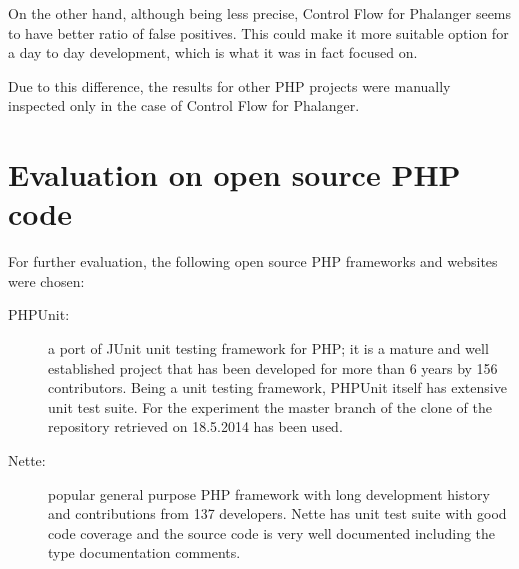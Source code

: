 On the other hand, although being less precise, Control Flow for 
Phalanger seems to have better ratio of false positives. 
This could make it more suitable option for a day to day development, 
which is what it was in fact focused on. 

Due to this difference, the results for other PHP projects were 
manually inspected only in the case of Control Flow for Phalanger.


\section{Evaluation on open source PHP code}

For further evaluation, the following open source PHP frameworks and 
websites were chosen:

\begin{description}
    \item[PHPUnit:] a port of JUnit unit testing framework for PHP; it is a mature 
    and well established project that has been developed for more than 6 years 
    by 156 contributors. Being a unit testing framework, PHPUnit itself has extensive 
    unit test suite. For the experiment the master branch of the clone of the 
    repository retrieved on 18.5.2014 has been used. 
    
    \item[Nette:] popular general purpose PHP framework with long development 
    history and contributions from 137 developers. Nette has unit test suite 
    with good code coverage and the source code is very well documented including 
    the type documentation comments.
\end{description}

    \begin{comment}
    \item[Zend Framework:] popular general purpose PHP framework. Lorem ipsum...
        \note{over 3000 problems reported. Quite a big bite to chew with analysing and categorizing all of them.}        
        
    \item[Piwik:] open source version of Google Analytics. \note{few hundred problems found, not categorized yet}
    
    \item[PrestaShop:] open source e-commerce solution. \note{few hundred problems found, not categorized yet}
    
    \item[Composer:] popular dependency management system for PHP libraries. \note{few hundred problems found, not categorized yet}
    \end{comment}

